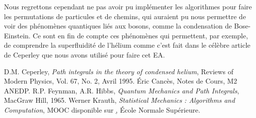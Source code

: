 \documentclass[11pt]{article}
\theoremstyle{definition}
\theoremstyle{remark}
\begin{document}
Nous regrettons cependant ne pas avoir pu implémenter les algorithmes pour faire les permutations de particules et de chemins, qui auraient pu nous permettre de voir des phénomènes quantiques liés aux bosons, comme la condensation de Bose-Einstein. Ce sont en fin de compte ces phénomènes qui permettent, par exemple, de comprendre la superfluidité de l'hélium comme c'est fait dans le célèbre article de Ceperley que nous avons utilisé pour faire cet EA. 

\newpage
\begin{thebibliography}{analytique}
D.M. Ceperley, \textit{Path integrals in the theory of condensed helium}, Reviews of Modern Physics, Vol. 67, No. 2, Avril 1995.
Éric Cancès, Notes de Cours, M2 ANEDP.
R.P. Feynman, A.R. Hibbs, \textit{Quantum Mechanics and Path Integrals}, MacGraw Hill, 1965.
 Werner Krauth, \textit{Statistical Mechanics : Algorithms and Computation}, MOOC disponible sur \href{http://coursera.org}, École Normale Supérieure. 
\end{thebibliography}
\end{document}
